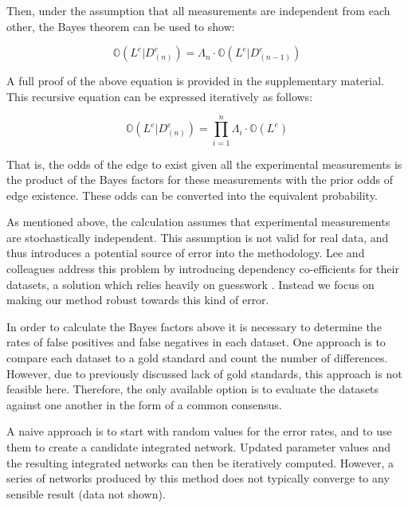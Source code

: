 \documentclass{bioinfo}
\newcommand{\odds}{\mathbb{O}}
\begin{document}
\begin{methods}
Then, under the assumption that all measurements are independent from each other, the Bayes theorem can be used to show:

\begin{equation} 
	\odds(L^e|D^e_{(n)}) = \Lambda_n \cdot \odds(L^e|D^e_{(n-1)})
\end{equation}

A full proof of the above equation is provided in the supplementary material. This recursive equation can be expressed iteratively as follows:

\begin{equation} 
	\odds(L^e|D^e_{(n)}) = \prod_{i=1}^n \Lambda_i \cdot \odds(L^e)
\end{equation}

That is, the odds of the edge to exist given all the experimental measurements is the product of the Bayes factors for these measurements with the prior odds of edge existence. These odds can be converted into the equivalent probability. 

As mentioned above, the calculation assumes that experimental measurements are stochastically independent. This assumption is not valid for real data, and thus introduces a potential source of error into the methodology. Lee and colleagues address this problem by introducing dependency co-efficients for their datasets, a solution which relies heavily on guesswork \citep{lee_probabilistic_2004}. Instead we focus on making our method robust towards this kind of error. 

In order to calculate the Bayes factors above it is necessary to determine the rates of false positives and false negatives in each dataset. One approach is to compare each dataset to a gold standard and count the number of differences. However, due to previously discussed lack of gold standards, this approach is not feasible here. Therefore, the only available option is to evaluate the datasets against one another in the form of a common consensus. 

A naive approach is to start with random values for the error rates, and to use them to create a candidate integrated network. Updated parameter values and the resulting integrated networks can then be iteratively computed. However, a series of networks produced by this method does not typically converge to any sensible result (data not shown).


\end{methods}
\end{document}
